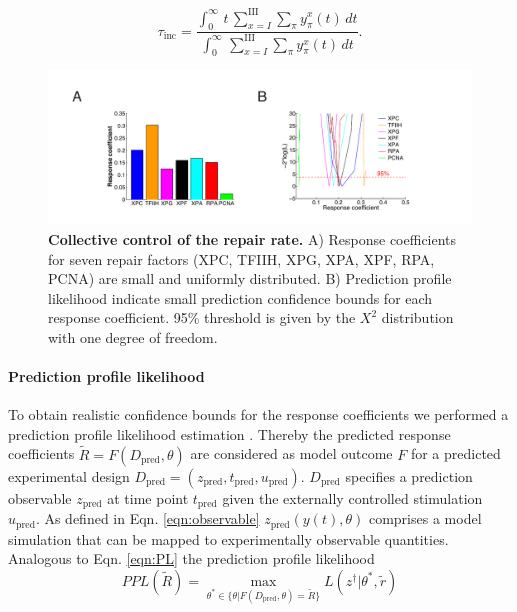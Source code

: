 \begin{equation}
\tau_{\text{inc}}=\frac{\int^\infty_0 \,t \,\sum_{x=I}^{\text{III}} \sum_ \pi  y_\pi^x(t)\,dt}{\int^\infty_0  \,\sum_{x=I}^{\text{III}} \sum_ \pi  y_\pi^x(t)\,dt}.
\end{equation}    



\begin{figure}[htbp]
	\begin{center}
		\includegraphics[width=1\textwidth]{Abbildungen/figure3_1.pdf}
		\caption{\textbf{Collective control of the repair rate.} A) Response coefficients for seven repair factors (XPC, TFIIH, XPG, XPA, XPF, RPA, PCNA) are small and uniformly distributed.  B) Prediction profile likelihood indicate small prediction confidence bounds for each response coefficient. 95\% threshold is given by the $X^2$ distribution with one degree of freedom.}
		\label{fig:controlCoefficients}
	\end{center}
\end{figure}

\paragraph{Prediction profile likelihood}
To obtain realistic confidence bounds for the response coefficients we performed a prediction profile likelihood estimation \cite{Kreutz2012,Hinkley1979}. Thereby the predicted response coefficients $\tilde{R} = F(D_{\text{pred}},\theta)$ are considered as model outcome $F$ for a predicted experimental design $D_{\text{pred}}= (z_{\text{pred}},t_{\text{pred}},u_{\text{pred}})$. $D_{\text{pred}}$ specifies a prediction observable $z_{\text{pred}}$ at time point $t_{\text{pred}}$ given the externally controlled stimulation $u_{\text{pred}}$. As defined in Eqn. \ref{eqn:observable} $z_{\text{pred}}(y(t),\theta)$ comprises a model simulation that can be mapped to experimentally observable quantities. Analogous to Eqn. \ref{eqn:PL} the prediction profile likelihood 
\begin{equation}
	PPL(\tilde{R}) = \max_{\theta^\ast \in \{\theta \lvert F(D_{\text{pred}},\theta)=\tilde{R}\}} L(z^\dag \lvert \theta^\ast,\tilde{r}) 
\end{equation}   

